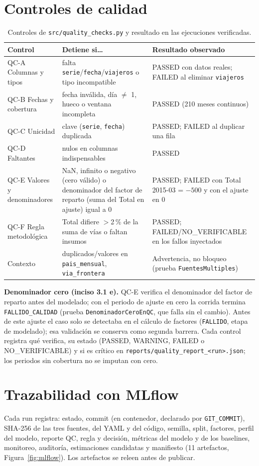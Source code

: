 \documentclass[11pt,a4paper]{article}
\newcommand{\cod}[1]{\texttt{\small #1}}
\begin{document}
\section{Controles de calidad}
\begin{table}[H]\centering\small
\caption{Controles de \cod{src/quality\_checks.py} y resultado en las ejecuciones verificadas.}
\begin{tabularx}{\textwidth}{@{}lLL@{}}\toprule
Control & Detiene si\ldots & Resultado observado\\\midrule
QC-A Columnas y tipos & falta \cod{serie}/\cod{fecha}/\cod{viajeros} o tipo incompatible & PASSED con datos reales; FAILED al eliminar \cod{viajeros}\\
QC-B Fechas y cobertura & fecha inválida, día $\neq$ 1, hueco o ventana incompleta & PASSED (210 meses continuos)\\
QC-C Unicidad & clave (\cod{serie}, \cod{fecha}) duplicada & PASSED; FAILED al duplicar una fila\\
QC-D Faltantes & nulos en columnas indispensables & PASSED\\
QC-E Valores y denominadores & NaN, infinito o negativo (cero válido) o denominador del factor de reparto (suma del Total en ajuste) igual a 0 & PASSED; FAILED con Total 2015-03 = $-500$ y con el ajuste en 0\\
QC-F Regla metodológica & Total difiere $>$2\,\% de la suma de vías o faltan insumos & PASSED; FAILED/NO\_VERIFICABLE en los fallos inyectados\\
Contexto & duplicados/valores en \cod{pais\_mensual}, \cod{via\_frontera} & Advertencia, no bloqueo (prueba \cod{FuentesMultiples})\\
\bottomrule\end{tabularx}
\end{table}
\noindent\textbf{Denominador cero (inciso 3.1 e).} QC-E verifica el denominador del factor de reparto antes del modelado; con el periodo de ajuste en cero la corrida termina \cod{FALLIDO\_CALIDAD} (prueba \cod{DenominadorCeroEnQC}, que falla sin el cambio). Antes de este ajuste el caso solo se detectaba en el cálculo de factores (\cod{FALLIDO}, etapa de modelado); esa validación se conserva como segunda barrera. Cada control registra qué verifica, su estado (PASSED, WARNING, FAILED o NO\_VERIFICABLE) y si es crítico en \cod{reports/quality\_report\_<run>.json}; los periodos sin cobertura no se imputan con cero.

\section{Trazabilidad con MLflow}
Cada run registra: estado, commit (en contenedor, declarado por \cod{GIT\_COMMIT}), SHA-256 de las tres fuentes, del YAML y del código, semilla, split, factores, perfil del modelo, reporte QC, regla y decisión, métricas del modelo y de los baselines, monitoreo, auditoría, estimaciones candidatas y manifiesto (11 artefactos, Figura~\ref{fig:mlflow}). Los artefactos se releen antes de publicar.
\end{document}
